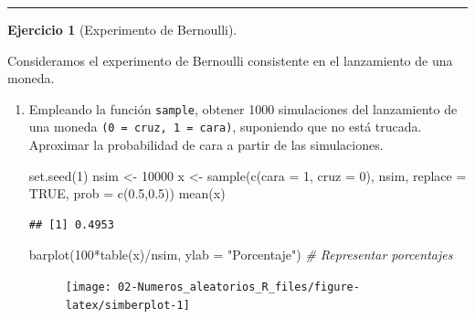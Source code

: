 \documentclass[
]{book}
\newenvironment{Shaded}{\begin{snugshade}}{\end{snugshade}}
\newcommand{\AttributeTok}[1]{\textcolor[rgb]{0.77,0.63,0.00}{#1}}
\newcommand{\CommentTok}[1]{\textcolor[rgb]{0.56,0.35,0.01}{\textit{#1}}}
\newcommand{\ConstantTok}[1]{\textcolor[rgb]{0.00,0.00,0.00}{#1}}
\newcommand{\DecValTok}[1]{\textcolor[rgb]{0.00,0.00,0.81}{#1}}
\newcommand{\FloatTok}[1]{\textcolor[rgb]{0.00,0.00,0.81}{#1}}
\newcommand{\FunctionTok}[1]{\textcolor[rgb]{0.00,0.00,0.00}{#1}}
\newcommand{\NormalTok}[1]{#1}
\newcommand{\OtherTok}[1]{\textcolor[rgb]{0.56,0.35,0.01}{#1}}
\newcommand{\SpecialCharTok}[1]{\textcolor[rgb]{0.00,0.00,0.00}{#1}}
\newcommand{\StringTok}[1]{\textcolor[rgb]{0.31,0.60,0.02}{#1}}
\theoremstyle{break}
\theoremstyle{definition}
\theoremstyle{definition}
\theoremstyle{definition}
\newtheorem{exercise}{Ejercicio}[chapter]
\theoremstyle{definition}
\theoremstyle{remark}
\begin{document}
\begin{center}\rule{0.5\linewidth}{0.5pt}\end{center}

\begin{exercise}[Experimento de Bernoulli]
\protect\hypertarget{exr:bernouilli}{}{\label{exr:bernouilli} {} }
\end{exercise}
Consideramos el experimento de Bernoulli consistente en el
lanzamiento de una moneda.

\begin{enumerate}
\def\labelenumi{\alph{enumi})}
\item
  Empleando la función \texttt{sample}, obtener 1000 simulaciones del
  lanzamiento de una moneda \texttt{(0\ =\ cruz,\ 1\ =\ cara)}, suponiendo que
  no está trucada. Aproximar la probabilidad de cara a partir de
  las simulaciones.

\begin{Shaded}
\begin{Highlighting}[]
\FunctionTok{set.seed}\NormalTok{(}\DecValTok{1}\NormalTok{)}
\NormalTok{nsim }\OtherTok{\textless{}{-}} \DecValTok{10000}
\NormalTok{x }\OtherTok{\textless{}{-}} \FunctionTok{sample}\NormalTok{(}\FunctionTok{c}\NormalTok{(}\AttributeTok{cara =} \DecValTok{1}\NormalTok{, }\AttributeTok{cruz =} \DecValTok{0}\NormalTok{), nsim, }\AttributeTok{replace =} \ConstantTok{TRUE}\NormalTok{, }\AttributeTok{prob =} \FunctionTok{c}\NormalTok{(}\FloatTok{0.5}\NormalTok{,}\FloatTok{0.5}\NormalTok{))}
\FunctionTok{mean}\NormalTok{(x)}
\end{Highlighting}
\end{Shaded}

\begin{verbatim}
## [1] 0.4953
\end{verbatim}

\begin{Shaded}
\begin{Highlighting}[]
\FunctionTok{barplot}\NormalTok{(}\DecValTok{100}\SpecialCharTok{*}\FunctionTok{table}\NormalTok{(x)}\SpecialCharTok{/}\NormalTok{nsim, }\AttributeTok{ylab =} \StringTok{"Porcentaje"}\NormalTok{) }\CommentTok{\# Representar porcentajes }
\end{Highlighting}
\end{Shaded}

  \begin{figure}[!htb]

  {\centering \texttt{[image: 02-Numeros\_aleatorios\_R\_files/figure-latex/simberplot-1]} 

}
\end{figure}
\end{enumerate}
\end{document}
